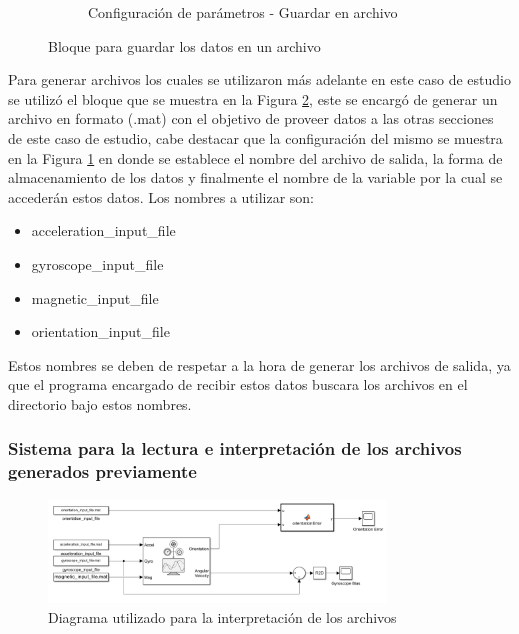 \begin{figure}[htbp]
\begin{subfigure}[b]{0.45\textwidth}
        \caption{Configuración de parámetros - Guardar en archivo}
        \label{fig:config_to_file_IMU}
    \end{subfigure}
    \caption{Bloque para guardar los datos en un archivo}
    \label{fig:to_file_IMU}
\end{figure}

Para  generar archivos los cuales se utilizaron más adelante en este caso de estudio se utilizó el bloque que se muestra en la Figura \ref{fig:to_file_IMU}, este se encargó de generar un archivo en formato (.mat) con el objetivo de proveer datos a las otras secciones de este caso de estudio, cabe destacar que la configuración del mismo se muestra en la Figura \ref{fig:config_to_file_IMU} en donde se establece el nombre del archivo de salida, la forma de almacenamiento de los datos y finalmente el nombre de la variable por la cual se accederán estos datos. Los nombres a utilizar son:

\begin{itemize}
    \item acceleration\_input\_file
    \item gyroscope\_input\_file
    \item magnetic\_input\_file
    \item orientation\_input\_file
\end{itemize}

Estos nombres se deben de respetar a la hora de generar los archivos de salida, ya que el programa encargado de recibir estos datos buscara los archivos en el directorio bajo estos nombres.

\newpage

\subsubsection{Sistema para la lectura e interpretación de los archivos generados previamente}

\begin{figure}[h!]
    \centering
    \includegraphics[width=0.8\textwidth]{fig/Capitulo5/Caso_de_estudio_IMU/Generador_de_salidas/flujo_lector_de_archivos.pdf}
    \caption{Diagrama utilizado para la interpretación de los archivos \cite{mathworks2024imu}}
    \label{fig:caso_de_estudio_2_IMU_interpretacion_de_archivos}
\end{figure}


